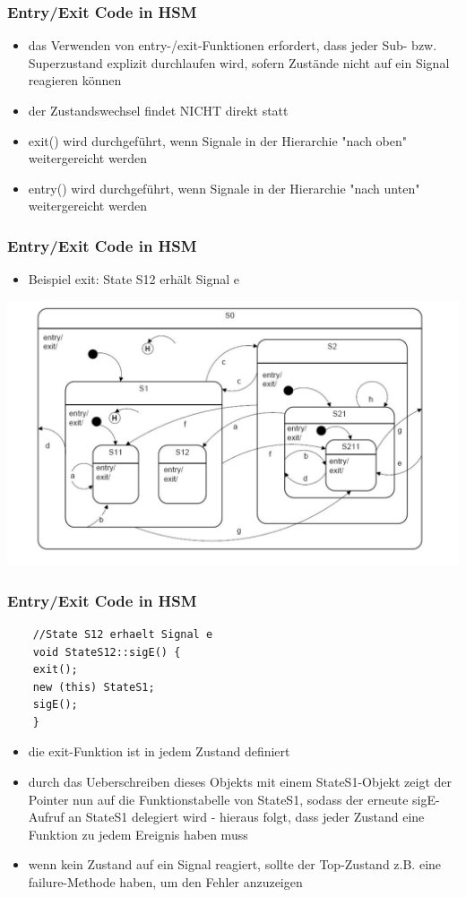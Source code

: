 \documentclass{beamer}
\begin{document}
\begin{frame}
	\frametitle{Entry/Exit Code in HSM }
	\begin{itemize}
		\item das Verwenden von entry-/exit-Funktionen erfordert, dass jeder Sub- bzw. Superzustand explizit durchlaufen wird, sofern Zust\"ande nicht auf ein Signal reagieren k\"onnen
		\item der Zustandswechsel findet NICHT direkt statt
		\item exit() wird durchgef\"uhrt, wenn Signale in der Hierarchie "nach oben" weitergereicht werden 
		\item entry() wird  durchgef\"uhrt, wenn Signale in der Hierarchie "nach unten" weitergereicht werden
	\end{itemize}
\end{frame}

\begin{frame}
	\frametitle{Entry/Exit Code in HSM }
	\begin{itemize}
		\item Beispiel exit: State S12 erh\"alt Signal e
	\end{itemize}
	\includegraphics[scale=.3]{img/beispiel_automat}
\end{frame}

\begin{frame}[fragile]
	\frametitle{Entry/Exit Code in HSM }
	\begin{lstlisting}
	//State S12 erhaelt Signal e
	void StateS12::sigE() {
	exit(); 
	new (this) StateS1;
	sigE();
	}
	\end{lstlisting}
	\begin{itemize}
		\item die exit-Funktion ist in jedem Zustand definiert
		\item durch das Ueberschreiben dieses Objekts mit einem StateS1-Objekt
		zeigt der Pointer nun auf die Funktionstabelle von StateS1,
		sodass der erneute sigE-Aufruf an StateS1 delegiert wird - hieraus folgt, dass jeder Zustand eine Funktion zu jedem Ereignis haben muss
		\item wenn kein Zustand auf ein Signal reagiert, sollte der Top-Zustand z.B. eine
		failure-Methode haben, um den Fehler anzuzeigen
	\end{itemize}
\end{frame}
\end{document}
